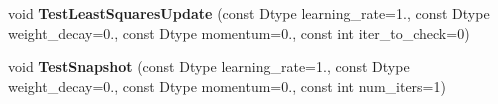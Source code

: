 \begin{DoxyCompactItemize}
\item 
\mbox{\label{classcaffe_1_1_gradient_based_solver_test_a7e07c64187e9fce79624b0edde1d5742}} 
void {\bfseries Test\+Least\+Squares\+Update} (const Dtype learning\+\_\+rate=1., const Dtype weight\+\_\+decay=0., const Dtype momentum=0., const int iter\+\_\+to\+\_\+check=0)
\item 
\mbox{\label{classcaffe_1_1_gradient_based_solver_test_a953965f50d4420c466ed88e4c42f3f1a}} 
void {\bfseries Test\+Snapshot} (const Dtype learning\+\_\+rate=1., const Dtype weight\+\_\+decay=0., const Dtype momentum=0., const int num\+\_\+iters=1)
\end{DoxyCompactItemize}
